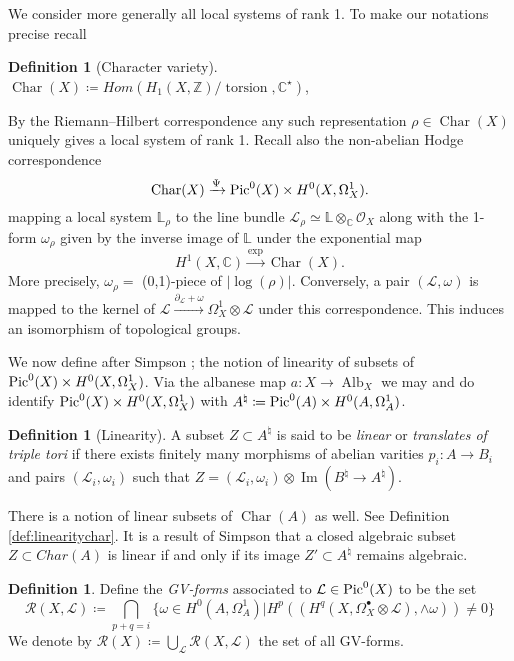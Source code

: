 \documentclass[11pt,reqno]{amsart}
\theoremstyle{definition}
\newtheorem{definition}[theorem]{Definition}
\theoremstyle{remark}
\theoremstyle{cited}
\theoremstyle{citeddef}
\DeclareMathOperator{\Alb}{Alb}
\DeclareMathOperator{\Char}{Char}
\DeclareMathOperator{\im}{Im}
\def\Pic{{\rm Pic}}
\newcommand{\sL}{\mathcal{L}}
\newcommand{\sO}{\mathcal{O}}
\newcommand{\sR}{\mathcal{R}}
\newcommand{\bbC}{\mathbb{C}}
\newcommand{\bbL}{\mathbb{L}}
\newcommand{\bbZ}{\mathbb{Z}}
\DeclareMathOperator{\torsion}{torsion}
\begin{document}
We consider more generally all local systems of rank 1. To make our notations precise recall 
\begin{definition}[Character variety]
$\Char(X) \coloneqq Hom(H_1(X, \bbZ)/\torsion, \bbC^{\star})$, 
\end{definition}
By the Riemann--Hilbert correspondence any such representation $\rho\in \Char(X)$ 
uniquely gives a local system of rank 1. 
Recall also the non-abelian Hodge
correspondence
\[\Char(X) \xrightarrow{\Psi} \Pic^{0}(X)\times H^0(X,\Omega_X^1).\]
mapping a local system $\bbL_{\rho}$ to the line bundle $\sL_{\rho}\simeq \bbL\otimes_{\bbC}\sO_X$
along with the 1-form $\omega_{\rho}$ given by the inverse image of $\bbL$ under
the exponential map
\begin{equation}
H^1(X,\bbC) \xrightarrow{\exp} \Char(X).
\label{eq:exponential}
\end{equation}
More precisely, $\omega_{\rho} = $ (0,1)-piece of $|\log(\rho)|$. Conversely, a pair $(\sL, \omega)$ 
is mapped to the kernel of $\sL\xrightarrow{\partial_{\sL}+\omega} \Omega_X^1\otimes \sL$ under this correspondence.
This induces an isomorphism of topological groups.

We now define after Simpson \cite[p.\ 365]{Sim93}; the notion of linearity of subsets of 
$\Pic^0(X)\times H^0(X,\Omega_X^1)$. Via the albanese
map $a\colon X\to \Alb_X$ we may and do identify
$\Pic^0(X)\times H^0(X,\Omega_X^1)$ with
$A^{\natural} \coloneqq \Pic^0(A)\times H^0(A,\Omega_A^1)$.
\begin{definition}[Linearity]\label{def:linhiggs}
A subset $Z\subset A^{\natural}$ is said to be \textsl{linear}
or \textsl{translates of triple tori}
if there exists finitely many morphisms of abelian varities
$p_i\colon A\to B_i$ and pairs $(\sL_i,\omega_i)$
such that $Z= (\sL_i,\omega_i)\otimes \im(B^{\natural}
\to A^{\natural})$.
\end{definition}
There is a notion of linear subsets of $\Char(A)$ as well. 
See Definition \ref{def:linearitychar}. It is a result of Simpson \cite[Theorem 3.1]{Sim93} that a closed algebraic subset $Z \subset Char(A)$ is linear if and only if its image $Z'\subset A^{\natural}$ remains algebraic. 

\begin{definition}
Define the \textsl{GV-forms} associated to $\sL\in \Pic^0(X)$
 to be the set
\[\sR(X, \sL) \coloneqq \bigcap_{p+q = i}\{\omega\in H^0(A,\Omega_A^1)|H^p((H^q(X,\Omega_X^{\bullet}\otimes \sL),\wedge\omega)) \neq 0
\}
\]
We denote by $\sR(X) \coloneqq \bigcup_{\sL}\sR(X, \sL)$
the set of all GV-forms.
\end{definition}
\end{document}
